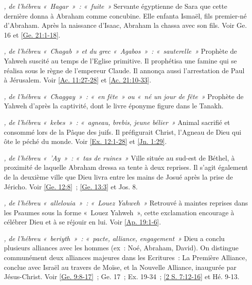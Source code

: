 \begin{multicols}{2}
\textit{, de l'hébreu «~Hagar~»~: «~fuite~»}\newline
Servante égyptienne de Sara que cette dernière donna à Abraham comme concubine. Elle enfanta Ismaël, fils premier-né d'Abraham. Après la naissance d'Isaac, Abraham la chassa avec son fils. Voir Ge. 16 et \vref{Ge. 21:1-18}.

\textit{, de l'hébreu «~Chagab~» et du grec «~Agabos~»~: «~sauterelle~»}\newline
Prophète de Yahweh suscité au temps de l'Eglise primitive. Il prophétisa une famine qui se réalisa sous le règne de l'empereur Claude. Il annonça aussi l'arrestation de Paul à Jérusalem. Voir \vref{Ac. 11:27-28} et \vref{Ac. 21:10-33}.

\textit{, de l'hébreu «~Chaggay~»~: «~en fête~» ou «~né un jour de fête~»}\newline
Prophète de Yahweh d'après la captivité, dont le livre éponyme figure dans le Tanakh.

\textit{, de l'hébreu «~kebes~»~: «~agneau, brebis, jeune bélier~»}\newline
Animal sacrifié et consommé lors de la Pâque des juifs. Il préfigurait Christ, l'Agneau de Dieu qui ôte le péché du monde. Voir \vref{Ex. 12:1-28} et \vref{Jn. 1:29}.

\textit{, de l'hébreu «~'Ay~»~: «~tas de ruines~»}\newline
Ville située au sud-est de Béthel, à proximité de laquelle Abraham dressa sa tente à deux reprises. Il s'agit également de la deuxième ville que Dieu livra entre les mains de Josué après la prise de Jéricho. Voir \vref{Ge. 12:8}~; \vref{Ge. 13:3} et Jos. 8.

\textit{, de l'hébreu «~allelouia~»~: «~Louez Yahweh~»}\newline
Retrouvé à maintes reprises dans les Psaumes sous la forme «~Louez Yahweh~», cette exclamation encourage à célébrer Dieu et à se réjouir en lui. Voir \vref{Ap. 19:1-6}.

\textit{, de l'hébreu «~beriyth~»~: «~pacte, alliance, engagement~»}\newline
Dieu a conclu plusieurs alliances avec les hommes (ex~: Noé, Abraham, David). On distingue communément deux alliances majeures dans les Ecritures~: La Première Alliance, conclue avec Israël au travers de Moïse, et la Nouvelle Alliance, inaugurée par Jésus-Christ. Voir \vref{Ge. 9:8-17}~; Ge. 17~; Ex. 19-34~; \vref{2 S. 7:12-16} et Hé. 9-13.


\end{multicols}
